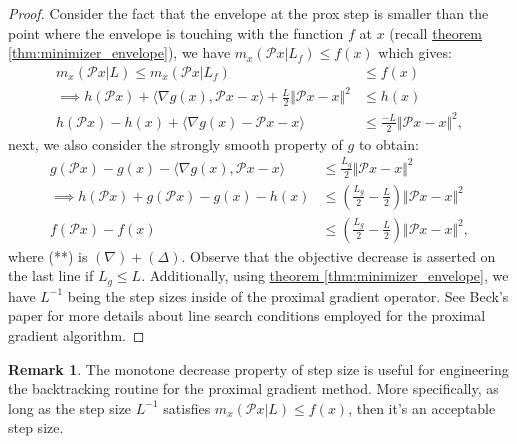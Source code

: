 \documentclass[]{article}
\theoremstyle{definition}
\newtheorem{remark}{Remark}[subsection]
{
    \newtheorem{assumption}{Assumption}
}
\begin{document}
        \begin{proof}Consider the fact that the envelope at the prox step is smaller than the point where the envelope is touching with the function $f$ at $x$ (recall \hyperref[thm:minimizer_envelope]{theorem \ref*{thm:minimizer_envelope}}), we have $m_x(\mathcal Px|L_f)\le f(x)$ which gives: 
            \begin{align*}
                m_x(\mathcal Px|L) \le m_x(\mathcal Px|L_f) 
                &\le f(x)
                \\
                \implies h(\mathcal Px)+ 
                \langle \nabla g(x), \mathcal P x - x\rangle + \frac{L}{2}\Vert \mathcal Px - x\Vert^2 
                &\le h(x)
                \\
                h(\mathcal Px) - h(x) + \langle \nabla g(x) - \mathcal Px - x\rangle 
                &\le \frac{-L}{2} \Vert \mathcal Px - x\Vert^2, \tag{$\Delta$}
            \end{align*}
            next, we also consider the strongly smooth property of $g$ to obtain: 
            \begin{align*}
                g(\mathcal Px) - g(x) - \langle \nabla g(x), \mathcal Px - x\rangle 
                & \le \frac{L_g}{2}\Vert \mathcal Px - x\Vert^2 \tag{$\nabla$}
                \\
                \implies
                h(\mathcal Px) + g(\mathcal Px) - g(x) - h(x)
                &\le 
                \left(
                    \frac{L_g}{2} - \frac{L}{2}
                \right)\Vert \mathcal Px - x\Vert^2 \tag{**}
                \\
                f(\mathcal Px) - f(x) 
                &\le
                \left(
                    \frac{L_g}{2} - \frac{L}{2}
                \right)\Vert \mathcal Px - x\Vert^2, 
            \end{align*}
            where (**) is $(\nabla) + (\Delta)$. Observe that the objective decrease is asserted on the last line if $L_g \le L$. Additionally, using \hyperref[thm:minimizer_envelope]{theorem \ref*{thm:minimizer_envelope}}, we have $L^{-1}$ being the step sizes inside of the proximal gradient operator. See Beck's paper \cite{paper:FISTA} for more details about line search conditions employed for the proximal gradient algorithm.
        \end{proof}
        \begin{remark}
            The monotone decrease property of step size is useful for engineering the backtracking routine for the proximal gradient method. More specifically, as long as the step size $L^{-1}$ satisfies $m_x(\mathcal Px | L)\le f(x)$, then it's an acceptable step size. 
        \end{remark}
\end{document}
